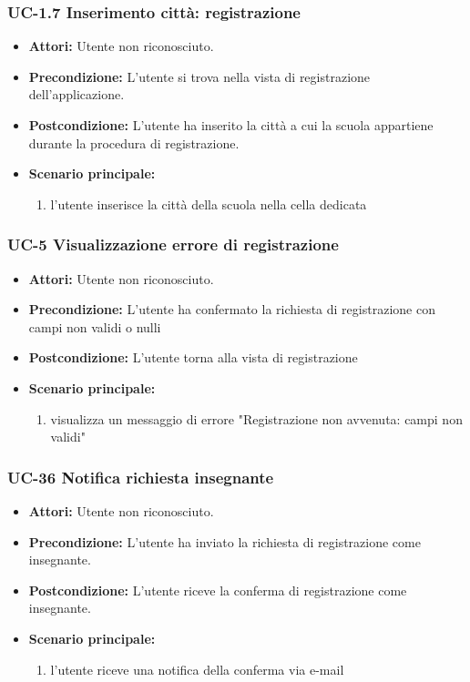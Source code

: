 \subsubsection{UC-1.7 Inserimento città: registrazione}
\begin{itemize}
	\item \textbf{Attori: }Utente non riconosciuto.
	\item \textbf{Precondizione: }L'utente si trova nella vista 		di registrazione dell'applicazione.
	\item \textbf{Postcondizione: }L'utente ha inserito la città a cui la scuola appartiene durante la procedura di registrazione.
	\item \textbf{Scenario principale: }
	\begin{enumerate}
		\item l'utente inserisce la città della scuola nella cella dedicata
	\end{enumerate}
\end{itemize}

\subsubsection{UC-5 Visualizzazione errore di registrazione}
\begin{itemize}
	\item \textbf{Attori:} Utente non riconosciuto.
	\item \textbf{Precondizione:} L'utente ha confermato la richiesta di registrazione con campi non validi o nulli
	\item \textbf{Postcondizione:} L'utente torna alla vista di registrazione
	\item  \textbf{Scenario principale: }
	\begin{enumerate}
		\item visualizza un messaggio di errore "Registrazione non avvenuta: campi non validi"
	\end{enumerate}
\end{itemize}

\subsubsection{UC-36 Notifica richiesta insegnante}
   \begin{itemize}
   \item \textbf{Attori:} Utente non riconosciuto.
   \item \textbf{Precondizione:} L'utente ha inviato la richiesta di registrazione come insegnante.
   \item \textbf{Postcondizione:} L'utente riceve la conferma di registrazione come insegnante. 
   \item \textbf{Scenario principale:}
    \begin{enumerate}
     \item l'utente riceve una notifica della conferma via e-mail
    \end{enumerate}
  \end{itemize}

